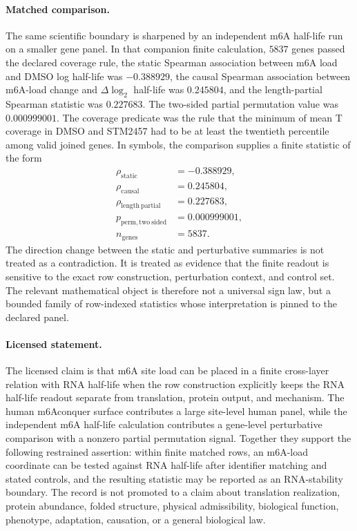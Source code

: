 \paragraph{Matched comparison.}
The same scientific boundary is sharpened by an independent m6A half-life run on a smaller gene panel.  In that companion finite calculation, $5837$ genes passed the declared coverage rule, the static Spearman association between m6A load and DMSO log half-life was $-0.388929$, the causal Spearman association between m6A-load change and $\Delta \log_2$ half-life was $0.245804$, and the length-partial Spearman statistic was $0.227683$.  The two-sided partial permutation value was $0.000999001$.  The coverage predicate was the rule that the minimum of mean T coverage in DMSO and STM2457 had to be at least the twentieth percentile among valid joined genes.  In symbols, the comparison supplies a finite statistic of the form
$$\begin{aligned}
  \rho_{\mathrm{static}} &= -0.388929,\\
  \rho_{\mathrm{causal}} &= 0.245804,\\
  \rho_{\mathrm{length\ partial}} &= 0.227683,\\
  p_{\mathrm{perm, two\ sided}} &= 0.000999001,\\
  n_{\mathrm{genes}} &= 5837.
\end{aligned}$$
The direction change between the static and perturbative summaries is not treated as a contradiction.  It is treated as evidence that the finite readout is sensitive to the exact row construction, perturbation context, and control set.  The relevant mathematical object is therefore not a universal sign law, but a bounded family of row-indexed statistics whose interpretation is pinned to the declared panel.

\paragraph{Licensed statement.}
The licensed claim is that m6A site load can be placed in a finite cross-layer relation with RNA half-life when the row construction explicitly keeps the RNA half-life readout separate from translation, protein output, and mechanism.  The human m6Aconquer surface contributes a large site-level human panel, while the independent m6A half-life calculation contributes a gene-level perturbative comparison with a nonzero partial permutation signal.  Together they support the following restrained assertion: within finite matched rows, an m6A-load coordinate can be tested against RNA half-life after identifier matching and stated controls, and the resulting statistic may be reported as an RNA-stability boundary.  The record is not promoted to a claim about translation realization, protein abundance, folded structure, physical admissibility, biological function, phenotype, adaptation, causation, or a general biological law.

